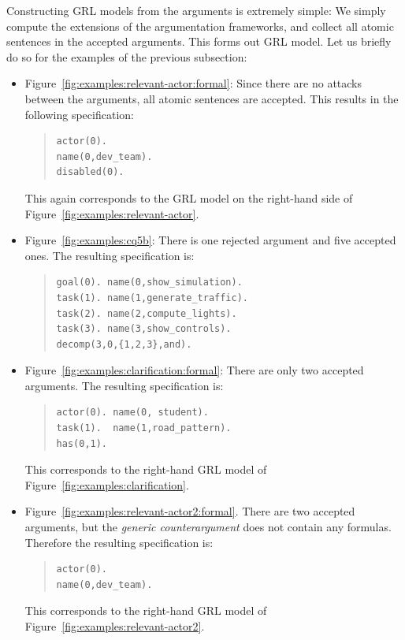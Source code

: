 Constructing GRL models from the arguments is extremely simple: We simply compute the extensions of the argumentation frameworks, and collect all atomic sentences in the accepted arguments. This forms out GRL model. Let us briefly do so for the examples of the previous subsection:
\begin{itemize}
\item
Figure~\ref{fig:examples:relevant-actor:formal}: Since there are no attacks between the arguments, all atomic sentences are accepted. This results in the following specification: 
\begin{quote}
\begin{verbatim}
actor(0).
name(0,dev_team).
disabled(0).
\end{verbatim}
\end{quote}
This again corresponds to the GRL model on the right-hand side of Figure~\ref{fig:examples:relevant-actor}.
\item
Figure~\ref{fig:examples:cq5b}: There is one rejected argument and five accepted ones. The resulting specification is:
\begin{quote}
\begin{verbatim}
goal(0). name(0,show_simulation).
task(1). name(1,generate_traffic).
task(2). name(2,compute_lights).
task(3). name(3,show_controls).
decomp(3,0,{1,2,3},and).
\end{verbatim}
\end{quote}
\item Figure~\ref{fig:examples:clarification:formal}: There are only two accepted arguments. The resulting specification is:
\begin{quote}
\begin{verbatim}
actor(0). name(0, student).
task(1).  name(1,road_pattern).
has(0,1).
\end{verbatim}
\end{quote}
This corresponds to the right-hand GRL model of Figure~\ref{fig:examples:clarification}.
\item Figure~\ref{fig:examples:relevant-actor2:formal}. There are two accepted arguments, but the \emph{generic counterargument} does not contain any formulas. Therefore the resulting specification is:
\begin{quote}
\begin{verbatim}
actor(0).
name(0,dev_team).
\end{verbatim}
\end{quote}
This corresponds to the right-hand GRL model of Figure~\ref{fig:examples:relevant-actor2}.
\end{itemize}